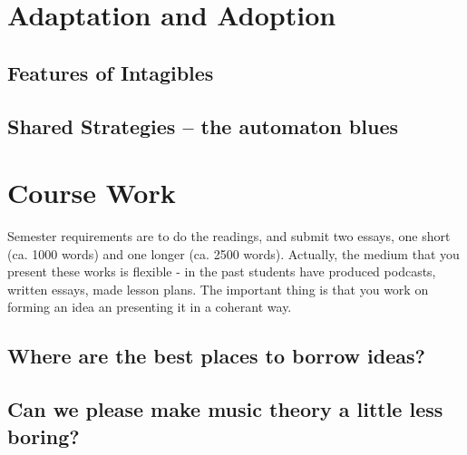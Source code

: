 \documentclass[11pt]{article}
\begin{document}
\section{Adaptation and Adoption}
\label{sec:org8134858}
\subsection{Features of Intagibles}
\label{sec:orge550a1e}
\subsection{Shared Strategies – the automaton blues}
\label{sec:org1482a7e}

\section{Course Work}
\label{sec:orgd390cef}
Semester requirements are to do the readings, and submit two essays,
one short (ca. 1000 words) and one longer (ca. 2500 words). Actually,
the medium that you present these works is flexible - in the past
students have produced podcasts, written essays, made lesson
plans. The important thing is that you work on forming an idea an
presenting it in a coherant way. 

\subsection{Where are the best places to borrow ideas?}
\label{sec:orga8bea41}
\subsection{Can we please make music theory a little less boring?}
\label{sec:org23818ea}
\end{document}
